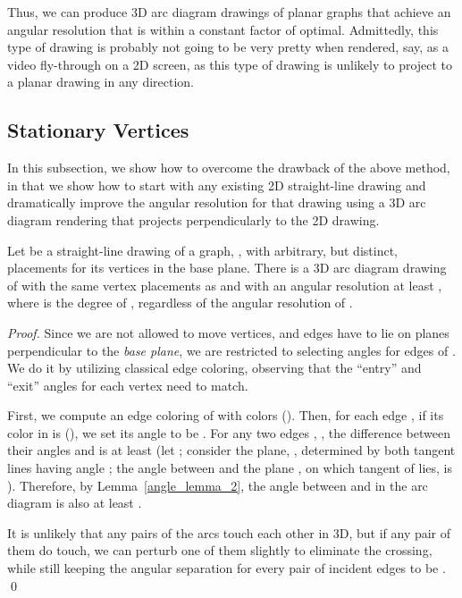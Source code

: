 Thus, we can produce 3D arc diagram drawings 
of planar graphs that achieve an angular resolution that is within a constant
factor of optimal. Admittedly, this type of drawing is probably
not going to be very pretty when rendered, say, as a video fly-through
on a 2D screen, as this type of drawing
is unlikely to project to a planar drawing in any direction.

\subsection{Stationary Vertices}
In this subsection, we show how to overcome the drawback of the above method,
in that we show how to start with any existing 2D straight-line drawing
and dramatically
improve the angular resolution for that drawing using a 3D arc diagram
rendering that projects perpendicularly to the 2D drawing.

\begin{theorem}
Let  be a straight-line drawing of a graph, , with arbitrary, but
distinct, placements for its vertices in the base plane.
There is a 3D arc diagram drawing of  with the same vertex
placements as  and with an angular resolution at least
, where  is the degree of ,
regardless of the angular resolution of .
\label{stationary_thm_1}
\end{theorem}
\begin{proof}
Since we are not allowed to move vertices, and edges have to lie
on planes perpendicular to the \emph{base plane}, we are restricted
to selecting angles  for edges  of . We do it by
utilizing classical edge coloring, observing that the ``entry''
and ``exit'' angles for each vertex need to match.

First, we compute an edge
coloring  of  with  colors ().
Then, for each edge , if its color in  is 
(), we set its angle to be
.
For any two edges , , the difference between their
angles  and 
is at least  (let ;
consider the plane, , determined by both tangent lines
having angle ; the angle between  and the plane
, on which tangent of  lies, is
).
Therefore, by Lemma~\ref{angle_lemma_2},
the angle between  and  in the arc diagram is also at least
.

It is unlikely that any pairs of the arcs touch each other in 3D, but
if any pair of them do touch, we can perturb one of them slightly to
eliminate the crossing, while still keeping the angular separation for
every pair of incident edges to be .
\qed
\end{proof}

